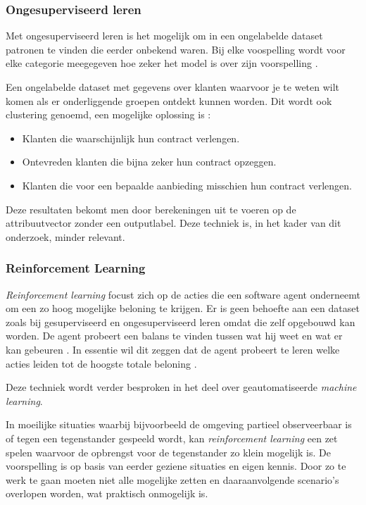 \subsubsection{Ongesuperviseerd leren}
\label{subsubsec:ongesuperviseerd-leren}

Met ongesuperviseerd leren is het mogelijk om in een ongelabelde dataset patronen te vinden die eerder onbekend waren. Bij elke voospelling wordt voor elke categorie meegegeven hoe zeker het model is over zijn voorspelling \autocite{Hinton1999}.

Een ongelabelde dataset met gegevens over klanten waarvoor je te weten wilt komen als er onderliggende groepen ontdekt kunnen worden. Dit wordt ook clustering genoemd, een mogelijke oplossing is \autocite{Lievens2019}:

\begin{itemize}
    \item Klanten die waarschijnlijk hun contract verlengen.
    \item Ontevreden klanten die bijna zeker hun contract opzeggen.
    \item Klanten die voor een bepaalde aanbieding misschien hun contract verlengen.
\end{itemize}

Deze resultaten bekomt men door berekeningen uit te voeren op de attribuutvector zonder een outputlabel. Deze techniek is, in het kader van dit onderzoek, minder relevant.

\subsubsection{Reinforcement Learning}
\label{subsubsec:reinforcement-learning}

\textit{Reinforcement learning} focust zich op de acties die een software agent onderneemt om een zo hoog mogelijke beloning te krijgen. Er is geen behoefte aan een dataset zoals bij gesuperviseerd en ongesuperviseerd leren omdat die zelf opgebouwd kan worden. De agent probeert een balans te vinden tussen wat hij weet en wat er kan gebeuren \autocite{Kaelbling1996}. In essentie wil dit zeggen dat de agent probeert te leren welke acties leiden tot de hoogste totale beloning \autocite{Lievens2019}.

Deze techniek wordt verder besproken in het deel over geautomatiseerde \textit{machine learning}.

In moeilijke situaties waarbij bijvoorbeeld de omgeving partieel observeerbaar is of tegen een tegenstander gespeeld wordt, kan \textit{reinforcement learning} een zet spelen waarvoor de opbrengst voor de tegenstander zo klein mogelijk is. De voorspelling is op basis van eerder geziene situaties en eigen kennis. Door zo te werk te gaan moeten niet alle mogelijke zetten en daaraanvolgende scenario's overlopen worden, wat praktisch onmogelijk is.

